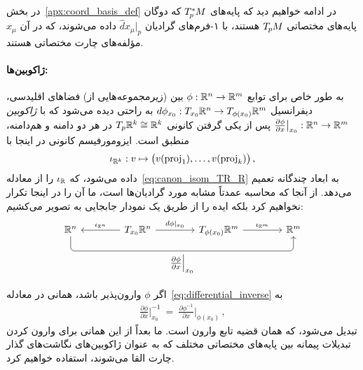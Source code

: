 در بخش~\ref{apx:coord_basis_def} در ادامه خواهیم دید که پایه‌های $T_{\mkern-1.5mu p}^{\mkern-0mu *}\mkern-1muM$ که دوگان پایه‌های مختصاتی $T_{\mkern-1.5mu p}\mkern-.5muM$ هستند، با ۱-فرم‌های گرادیان $\hat{d}x_\mu|_p$ داده می‌شوند، که در آن $x_\mu$ مؤلفه‌های چارت مختصاتی هستند.



\paragraph{ژاکوبین‌ها:}
به طور خاص برای توابع $\phi: \mathbb{R}^n \to \mathbb{R}^m$ بین (زیرمجموعه‌هایی از) فضاهای اقلیدسی، دیفرانسیل
$d\phi_{x_0}: {T_{x_0}\mathbb{R}^n \to T_{\phi(x_0)}\mathbb{R}^m}$
به راحتی دیده می‌شود که با \emph{ژاکوبین} $\frac{\partial \phi}{\partial x} \big|_{x_0}: \mathbb{R}^n \to \mathbb{R}^m$
پس از یکی گرفتن کانونی $T_p\mathbb{R}^k \cong \mathbb{R}^k$ در هر دو دامنه و هم‌دامنه، منطبق است.
ایزومورفیسم کانونی در اینجا با
\begin{align}\label{eq:canonical_iso_TRk_Rk}
	\iota_{\mathbb{R}^k}: v \mapsto \big( v(\operatorname{proj}_1), \dots, v(\operatorname{proj}_k) \big) \,,
\end{align}
داده می‌شود، که $\iota_{\mathbb{R}}$ را از معادله~\eqref{eq:canon_isom_TR_R} به ابعاد چندگانه تعمیم می‌دهد.
از آنجا که محاسبه عمدتاً مشابه مورد گرادیان‌ها است، ما آن را در اینجا تکرار نخواهیم کرد بلکه ایده را از طریق یک نمودار جابجایی به تصویر می‌کشیم:
\begin{equation}\label{cd:jacobian_def}
	\begin{tikzcd}[row sep=2.5em, column sep=4em]
		\R^n
		\arrow[rrr, rounded corners, to path={ 
			|- node[below, pos=.75]{$\frac{\partial \phi}{\partial x} \Big|_{x_0}$} ([yshift=-3.5ex]\tikztotarget.south)
			-- (\tikztotarget.south)
		}]
		& T_{x_0}\R^n
		\arrow[l, "\iota_{\R^n}"']
		\arrow[r, "{d\phi |_{x_0}}"]
		& T_{\phi(x_0)}\R^m
		\arrow[r, "\iota_{\R^m}"]
		& \R^m
	\end{tikzcd}
\end{equation}

اگر $\phi$ وارون‌پذیر باشد، همانی در معادله~\eqref{eq:differential_inverse} به
\begin{align}\label{eq:inv_fct_thm_jacobian}
	\frac{\partial \phi}{\partial x} \bigg|_{x_0}^{-1} \ =\ 
	\frac{\partial \phi^{-1}}{\partial x} \bigg|_{\phi(x_0)} \,,
\end{align}
تبدیل می‌شود، که همان قضیه تابع وارون است.
ما بعداً از این همانی برای وارون کردن تبدیلات پیمانه بین پایه‌های مختصاتی مختلف که به عنوان ژاکوبین‌های نگاشت‌های گذار چارت القا می‌شوند، استفاده خواهیم کرد.












